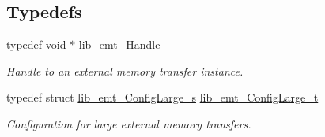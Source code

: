 \subsection*{Typedefs}
\begin{DoxyCompactItemize}
\item 
typedef void $\ast$ \hyperlink{group__libarch__memtrans_ga3ee110c7c5d95cfe386b113d2d078ec3}{lib\+\_\+emt\+\_\+\+Handle}
\begin{DoxyCompactList}\small\item\em Handle to an external memory transfer instance. \end{DoxyCompactList}\item 
typedef struct \hyperlink{structlib__emt__ConfigLarge__s}{lib\+\_\+emt\+\_\+\+Config\+Large\+\_\+s} \hyperlink{group__libarch__memtrans_ga437bfecb0c8f550b36bae0f0ee65702d}{lib\+\_\+emt\+\_\+\+Config\+Large\+\_\+t}
\begin{DoxyCompactList}\small\item\em Configuration for large external memory transfers. \end{DoxyCompactList}\end{DoxyCompactItemize}

